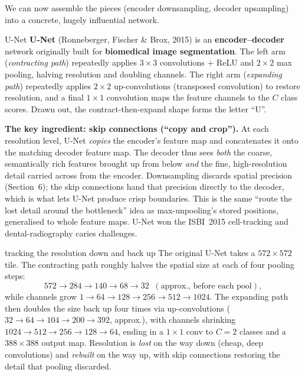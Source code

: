 \documentclass{report}
\begin{document}
We can now assemble the pieces (encoder downsampling, decoder upsampling) into a
concrete, hugely influential network.

\begin{defbox}{U-Net}
\textbf{U-Net} (Ronneberger, Fischer \& Brox, 2015) is an
\textbf{encoder--decoder} network originally built for \textbf{biomedical image
segmentation}. The left arm (\emph{contracting path}) repeatedly applies
$3\times3$ convolutions $+$ ReLU and $2\times2$ max pooling, halving resolution
and doubling channels. The right arm (\emph{expanding path}) repeatedly applies
$2\times2$ up-convolutions (transposed convolution) to restore resolution, and a
final $1\times1$ convolution maps the feature channels to the $C$ class scores.
Drawn out, the contract-then-expand shape forms the letter ``U''.
\end{defbox}

\begin{keybox}
\textbf{The key ingredient: skip connections (``copy and crop'').} At each
resolution level, U-Net \emph{copies} the encoder's feature map and concatenates
it onto the matching decoder feature map. The decoder thus sees \emph{both} the
coarse, semantically rich features brought up from below \emph{and} the fine,
high-resolution detail carried across from the encoder. Downsampling discards
spatial precision (Section~6); the skip connections hand that precision directly
to the decoder, which is what lets U-Net produce crisp boundaries. This is the
same ``route the lost detail around the bottleneck'' idea as max-unpooling's
stored positions, generalised to whole feature maps. U-Net won the ISBI~2015
cell-tracking and dental-radiography caries challenges.
\end{keybox}

\begin{exbox}{tracking the resolution down and back up}
The original U-Net takes a $572\times572$ tile. The contracting path roughly
halves the spatial size at each of four pooling steps:
\[
572 \to 284 \to 140 \to 68 \to 32 \;\;(\text{approx., before each pool}),
\]
while channels grow $1\to 64\to 128\to 256\to 512\to 1024$. The expanding path
then doubles the size back up four times via up-convolutions
($32\to 64\to 104\to 200\to 392$, approx.), with channels shrinking
$1024\to512\to256\to128\to64$, ending in a $1\times1$ conv to $C=2$ classes and
a $388\times388$ output map. Resolution is \emph{lost} on the way down (cheap,
deep convolutions) and \emph{rebuilt} on the way up, with skip connections
restoring the detail that pooling discarded.
\end{exbox}
\end{document}

